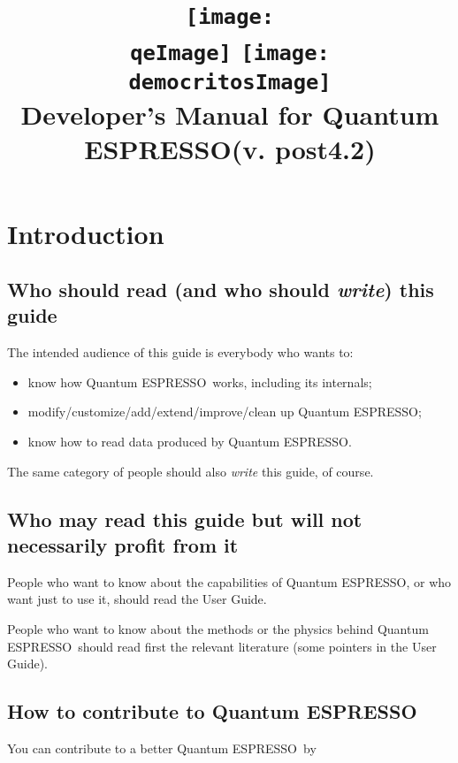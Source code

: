 \documentclass[12pt,a4paper]{article}
\def\version{post4.2}
\def\qe{{\sc Quantum ESPRESSO}}
\def\qeImage{quantum_espresso.pdf}
\def\democritosImage{democritos.pdf}
\def\qeImage{quantum_espresso.png}
\def\democritosImage{democritos.png}
\begin{document}
 
\author{}
\date{}
\title{
  \texttt{[image: \\qeImage]} \hskip 2cm
  \texttt{[image: \\democritosImage]}\\
  \vskip 1cm
  \Huge Developer's Manual for \qe (v. \version) \smallskip
}
\maketitle

\tableofcontents

\section{Introduction}
\subsection{Who should read (and who should {\em write}) this guide}

The intended audience of this guide is everybody who wants to:
\begin{itemize}
\item know how \qe\ works, including its internals;
\item modify/customize/add/extend/improve/clean up \qe;
\item know how to read data produced by \qe.
\end{itemize}
The same category of people should also {\em write} this guide, of course.

\subsection{Who may read this guide but will not necessarily profit from it}

People who want to know about the capabilities of \qe,
or who want just to use it, should read the User Guide.

People who want to know about the methods or the physics
behind \qe\ should read first the relevant  
literature (some pointers in the User Guide).

\subsection{How to contribute to \qe}

You can contribute to a better \qe\ by
\end{document}

